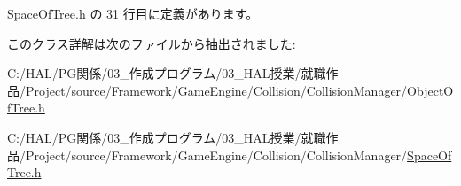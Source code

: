  Space\+Of\+Tree.\+h の 31 行目に定義があります。



このクラス詳解は次のファイルから抽出されました\+:\begin{DoxyCompactItemize}
\item 
C\+:/\+H\+A\+L/\+P\+G関係/03\+\_\+作成プログラム/03\+\_\+\+H\+A\+L授業/就職作品/\+Project/source/\+Framework/\+Game\+Engine/\+Collision/\+Collision\+Manager/\mbox{\hyperlink{_object_of_tree_8h}{Object\+Of\+Tree.\+h}}\item 
C\+:/\+H\+A\+L/\+P\+G関係/03\+\_\+作成プログラム/03\+\_\+\+H\+A\+L授業/就職作品/\+Project/source/\+Framework/\+Game\+Engine/\+Collision/\+Collision\+Manager/\mbox{\hyperlink{_space_of_tree_8h}{Space\+Of\+Tree.\+h}}\end{DoxyCompactItemize}
